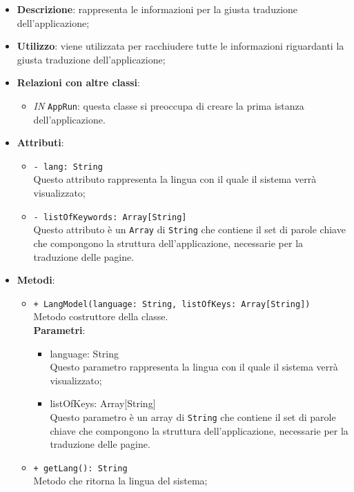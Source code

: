 		\begin{itemize}
			\item \textbf{Descrizione}: rappresenta le informazioni per la giusta traduzione dell'applicazione;
			\item \textbf{Utilizzo}: viene utilizzata per racchiudere tutte le informazioni riguardanti la giusta traduzione dell'applicazione;
			\item \textbf{Relazioni con altre classi}: 
			\begin{itemize}
				\item \textit{IN} \texttt{AppRun}: questa classe si preoccupa di creare la prima istanza dell'applicazione.
			\end{itemize}
			\item \textbf{Attributi}: 
			\begin{itemize}
				\item \texttt{- lang: String} \\
				Questo attributo rappresenta la lingua con il quale il sistema verrà visualizzato;  
				\item \texttt{- listOfKeywords: Array[String]} \\
				Questo attributo è un \texttt{Array} di \texttt{String} che contiene il set di parole chiave che compongono la struttura dell'applicazione, necessarie per la traduzione delle pagine.
			\end{itemize}
			\item \textbf{Metodi}: 
			\begin{itemize}
				\item \texttt{+ LangModel(language: String, listOfKeys: Array[String])} \\
				Metodo costruttore della classe.\\
				\textbf{Parametri}:
				\begin{itemize}
					\item {language: String}\\
					Questo parametro rappresenta la lingua con il quale il sistema verrà visualizzato;
					\item {listOfKeys: Array[String]}\\
					Questo parametro è un array di \texttt{String} che contiene il set di parole chiave che compongono la struttura dell'applicazione, necessarie per la traduzione delle pagine. 
				\end{itemize}
				
				\item \texttt{+ getLang(): String} \\
				Metodo che ritorna la lingua del sistema;
				

\end{itemize}
\end{itemize}
